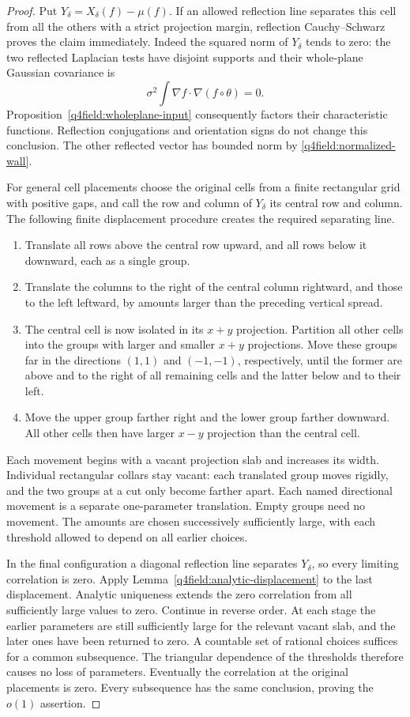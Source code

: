 \begin{proof}
Put $Y_\delta=X_\delta(f)-\mu(f)$.  If an allowed reflection line
separates this cell from all the others with a strict projection
margin, reflection Cauchy--Schwarz proves the claim immediately.
Indeed the squared norm of $Y_\delta$ tends to zero: the two reflected
Laplacian tests have disjoint supports and their whole-plane Gaussian
covariance is
\[
 \sigma^2\int\nabla f\cdot\nabla(f\circ\theta)=0.
\]
Proposition~\ref{q4field:wholeplane-input} consequently factors their
characteristic functions.  Reflection conjugations and orientation
signs do not change this conclusion.  The other reflected vector has
bounded norm by \eqref{q4field:normalized-wall}.

For general cell placements choose the original cells from a finite
rectangular grid with positive gaps, and call the row and column of
$Y_\delta$ its central row and column.  The following finite
displacement procedure creates the required separating line.
\begin{enumerate}[label=\arabic*.]
 \item Translate all rows above the central row upward, and all rows
 below it downward, each as a single group.
 \item Translate the columns to the right of the central column
 rightward, and those to the left leftward, by amounts larger than
 the preceding vertical spread.
 \item The central cell is now isolated in its $x+y$ projection.
 Partition all other cells into the groups with larger and smaller
 $x+y$ projections.  Move these groups far in the directions
 $(1,1)$ and $(-1,-1)$, respectively, until the former are above
 and to the right of all remaining cells and the latter below and
 to their left.
 \item Move the upper group farther right and the lower group
 farther downward.  All other cells then have larger $x-y$
 projection than the central cell.
\end{enumerate}
Each movement begins with a vacant projection slab and increases its
width.  Individual rectangular collars stay vacant: each translated
group moves rigidly, and the two groups at a cut only become farther
apart.  Each named directional movement is a separate one-parameter
translation.  Empty groups need no movement.  The amounts are chosen
successively sufficiently large, with each threshold allowed to
depend on all earlier choices.

In the final configuration a diagonal reflection line separates
$Y_\delta$, so every limiting correlation is zero.  Apply
Lemma~\ref{q4field:analytic-displacement} to the last displacement.
Analytic uniqueness extends the zero correlation from all
sufficiently large values to zero.  Continue in reverse order.
At each stage the earlier parameters are still sufficiently large
for the relevant vacant slab, and the later ones have been returned
to zero.  A countable set of rational choices suffices for a common
subsequence.  The triangular dependence of the thresholds therefore
causes no loss of parameters.  Eventually the correlation at the
original placements is zero.  Every subsequence has the same
conclusion, proving the $o(1)$ assertion.
\end{proof}

